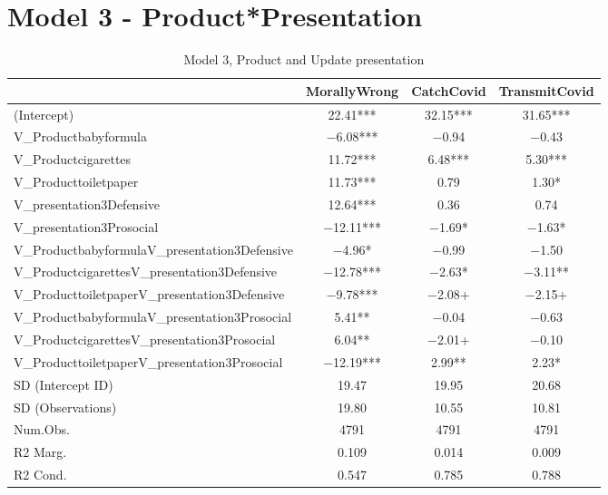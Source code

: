 \documentclass[]{report}
\begin{document}
	
	
	
\chapter{Model 3 - Product*Presentation}

	\begin{longtable}{lccc}

					\caption{Model 3, Product and Update presentation}\\
			\hline
			& MorallyWrong & CatchCovid & TransmitCovid\\
			\hline
			(Intercept) & \num{22.41}*** & \num{32.15}*** & \num{31.65}***\\
			V\_Productbabyformula & \num{-6.08}*** & \num{-0.94} & \num{-0.43}\\
			V\_Productcigarettes & \num{11.72}*** & \num{6.48}*** & \num{5.30}***\\
			V\_Producttoiletpaper & \num{11.73}*** & \num{0.79} & \num{1.30}*\\
			V\_presentation3Defensive & \num{12.64}*** & \num{0.36} & \num{0.74}\\
			V\_presentation3Prosocial & \num{-12.11}*** & \num{-1.69}* & \num{-1.63}*\\
			V\_ProductbabyformulaV\_presentation3Defensive & \num{-4.96}* & \num{-0.99} & \num{-1.50}\\
			V\_ProductcigarettesV\_presentation3Defensive & \num{-12.78}*** & \num{-2.63}* & \num{-3.11}**\\
			V\_ProducttoiletpaperV\_presentation3Defensive & \num{-9.78}*** & \num{-2.08}+ & \num{-2.15}+\\
			V\_ProductbabyformulaV\_presentation3Prosocial & \num{5.41}** & \num{-0.04} & \num{-0.63}\\
			V\_ProductcigarettesV\_presentation3Prosocial & \num{6.04}** & \num{-2.01}+ & \num{-0.10}\\
			V\_ProducttoiletpaperV\_presentation3Prosocial & \num{-12.19}*** & \num{2.99}** & \num{2.23}*\\
			SD (Intercept ID) & \num{19.47} & \num{19.95} & \num{20.68}\\
			SD (Observations) & \num{19.80} & \num{10.55} & \num{10.81}\\
			\hline
			Num.Obs. & \num{4791} & \num{4791} & \num{4791}\\
			R2 Marg. & \num{0.109} & \num{0.014} & \num{0.009}\\
			R2 Cond. & \num{0.547} & \num{0.785} & \num{0.788}\\

\end{longtable}
\end{document}
